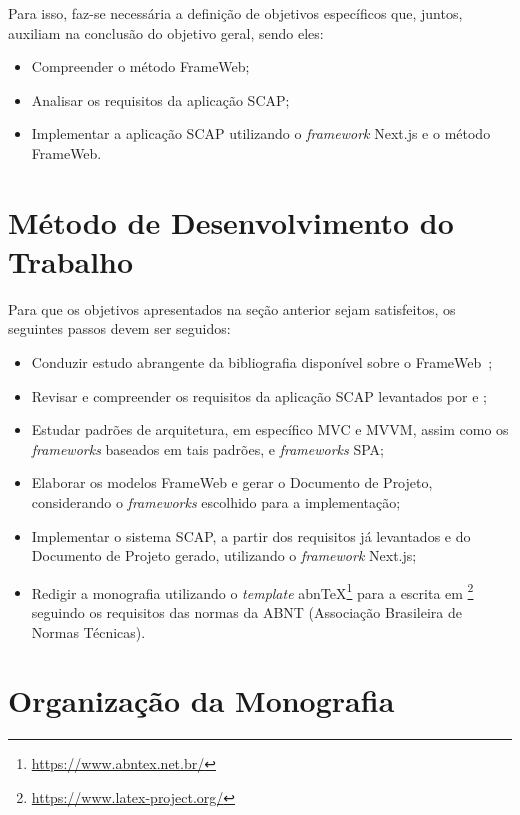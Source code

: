 Para isso, faz-se necessária a definição de objetivos específicos que, juntos, auxiliam na conclusão do objetivo geral, sendo eles:
\begin{itemize}
    \item Compreender o método FrameWeb;
    \item Analisar os requisitos da aplicação SCAP;
    \item Implementar a aplicação SCAP utilizando o \textit{framework} Next.js e o método FrameWeb.
\end{itemize}



\section{Método de Desenvolvimento do Trabalho}
\label{sec-intro-met}

Para que os objetivos apresentados na seção anterior sejam satisfeitos, os seguintes passos devem ser seguidos:

\begin{itemize}
    \item Conduzir estudo abrangente da bibliografia disponível sobre o FrameWeb~\cite{souza:2007,souza:2020};
    \item Revisar e compreender os requisitos da aplicação SCAP levantados por  e ;
    \item Estudar padrões de arquitetura, em específico MVC e MVVM, assim como os \textit{frameworks} baseados em tais padrões, e \textit{frameworks} SPA;
    \item Elaborar os modelos FrameWeb e gerar o Documento de Projeto, considerando o \textit{frameworks} escolhido para a implementação;
    \item Implementar o sistema SCAP, a partir dos requisitos já levantados e do Documento de Projeto gerado, utilizando o \textit{framework} Next.js;
    \item Redigir a monografia utilizando o \textit{template} abnTeX\footnote{\url{https://www.abntex.net.br/}} para a escrita em \latex\footnote{\url{https://www.latex-project.org/}} seguindo os requisitos das normas da ABNT (Associação Brasileira de Normas Técnicas).
\end{itemize}


\section{Organização da Monografia}
\label{sec-intro-organizacao}

